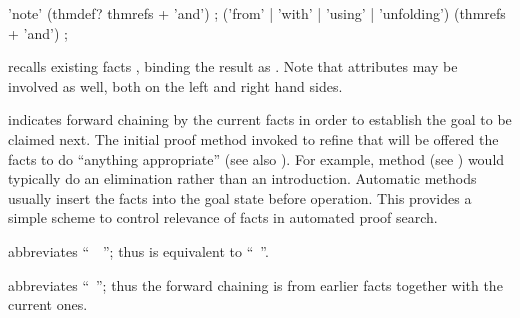 \begin{isabellebody}
\begin{isamarkuptext}
  \begin{rail}
    'note' (thmdef? thmrefs + 'and')
    ;
    ('from' | 'with' | 'using' | 'unfolding') (thmrefs + 'and')
    ;
  \end{rail}

  \begin{descr}

  \item [\hyperlink{command.note}{\mbox{\isa{\isacommand{note}}}}~\isa{{\isachardoublequote}a\ {\isacharequal}\ b\isactrlsub {\isadigit{1}}\ {\isasymdots}\ b\isactrlsub n{\isachardoublequote}}]
  recalls existing facts , binding
  the result as .  Note that attributes may be involved as
  well, both on the left and right hand sides.

  \item [\hyperlink{command.then}{\mbox{\isa{\isacommand{then}}}}] indicates forward chaining by the current
  facts in order to establish the goal to be claimed next.  The
  initial proof method invoked to refine that will be offered the
  facts to do ``anything appropriate'' (see also
  ).  For example, method \hyperlink{method.rule}{\mbox{}}
  (see ) would typically do an elimination
  rather than an introduction.  Automatic methods usually insert the
  facts into the goal state before operation.  This provides a simple
  scheme to control relevance of facts in automated proof search.
  
  \item [\hyperlink{command.from}{\mbox{\isa{\isacommand{from}}}}~\isa{b}] abbreviates ``\hyperlink{command.note}{\mbox{}}~~\hyperlink{command.then}{\mbox{}}''; thus \hyperlink{command.then}{\mbox{}} is
  equivalent to ``\hyperlink{command.from}{\mbox{}}~''.
  
  \item [\hyperlink{command.with}{\mbox{\isa{\isacommand{with}}}}~\isa{{\isachardoublequote}b\isactrlsub {\isadigit{1}}\ {\isasymdots}\ b\isactrlsub n{\isachardoublequote}}]
  abbreviates ``\hyperlink{command.from}{\mbox{}}~''; thus the forward chaining is from earlier facts together
  with the current ones.
  

\end{descr}
\end{isamarkuptext}
\end{isabellebody}
